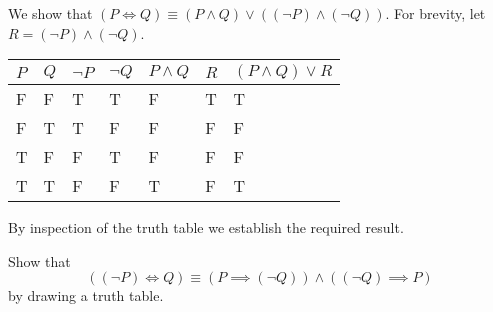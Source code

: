 \begin{example}
    We show that $(P \iff Q) \equiv (P \land Q) \lor ((\lnot P) \land (\lnot Q))$. For brevity, let $R = (\lnot P) \land (\lnot Q)$.
    \begin{table}[h]
        \centering
        \begin{tabular}{|l|l||l|l|l|l||l|}
            \hline
            $P$ & $Q$ & $\lnot P$ & $\lnot Q$ & $P \land Q$ & $R$ & $(P \land Q) \lor R$ \\ \hline
            F   & F   & T         & T         & F           & T   & T                    \\ \hline
            F   & T   & T         & F         & F           & F   & F                    \\ \hline
            T   & F   & F         & T         & F           & F   & F                    \\ \hline
            T   & T   & F         & F         & T           & F   & T                    \\ \hline
        \end{tabular}
    \end{table}

    By inspection of the truth table we establish the required result.
\end{example}

\begin{exercise}
    Show that
    \[
        ((\lnot P) \iff Q) \equiv (P \implies (\lnot Q)) \land ((\lnot Q) \implies P)
    \]
    by drawing a truth table.
\end{exercise}

\newpage

